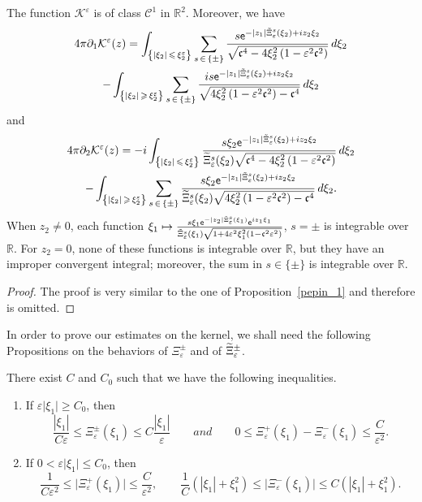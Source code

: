 \documentclass[AHL,Unicode,longabstracts,published]{cedram}
\newcommand*\p{\partial}
\newcommand*\R{\mathbb R}
\newcommand*\BC{\mathcal{C}}
\newcommand*\BK{\mathcal{K}}
\newcommand*\ex{{\sf e}}
\newcommand*\cs{{\mathfrak c}}
\newcommand*\gs{\geqslant }
\newcommand*\ls{\leqslant }
\newcommand*\e{\varepsilon}
\renewcommand*\t{\tilde}
\newcommand*{\romanenumi}{\renewcommand*{\theenumi}{\roman{enumi}}}
\let\oldtilde\tilde
\renewcommand*{\tilde}[1]{\mathchoice{\widetilde{#1}}{\widetilde{#1}}{\oldtilde{#1}}{\oldtilde{#1}}}
\begin{document}
\begin{prop}\label{pepin_2}
The function $ \BK^\e $ is of class $ \BC^1 $ in $ \R^2 $. Moreover, we have
\begin{multline*}
4 \pi \p_1 \BK^\e (z)=
 \int_{\left\{ |\xi_2 | \,\ls\,\xi_2^\e \right\} } \sum_{s\,\in\,\{ \pm \} }
\frac{ s \ex^{- |z_1| \t\Xi_\e^s (\xi_2) + i z_2 \xi_2} }{
\sqrt{ \cs^4 - 4 \xi_2^2 \left(1 - \e^2 \cs^2\right)}} \, d\xi_2\\
 - \int_{\left\{ |\xi_2 |\,\gs\,\xi_2^\e \right\} } \sum_{s\,\in\,\{ \pm \} } \frac{i s \ex^{- |z_1| \t\Xi_\e^s (\xi_2) + i z_2 \xi_2} }{\sqrt{ 4 \xi_2^2 \left(1 - \e^2 \cs^2\right) - \cs^4 } } \, d\xi_2
\end{multline*}
and
\begin{multline*}
4 \pi \p_2 \BK^\e (z)  =
-i \int_{\left\{ |\xi_2 |\,\ls\,\xi_2^\e \right\}}
\frac{ s \xi_2 \ex^{- |z_1| \t\Xi_\e^s (\xi_2) + i z_2 \xi_2}}{\t\Xi_\e^s (\xi_2) \sqrt{ \cs^4 - 4 \xi_2^2 \left(1 - \e^2 \cs^2\right)}} \, d\xi_2\\
- \int_{\left\{ |\xi_2 |\,\gs\,\xi_2^\e \right\} } \sum_{s\,\in\,\{ \pm \}}
\frac{s \xi_2 \ex^{- |z_1| \t\Xi_\e^s (\xi_2) + i z_2 \xi_2}}{\t\Xi_\e^s (\xi_2) \sqrt{ 4 \xi_2^2 \left(1 - \e^2 \cs^2\right) - \cs^4}} \, d\xi_2.
\end{multline*}
When $ z_2 \neq 0 $, each function $ \xi_1 \mapsto \frac{ s \xi_1 \ex^{- |z_2| \t{\Xi}_\e^s (\xi_1)} \ex^{i z_1 \xi_1} }{\t{\Xi}_\e^s (\xi_1)
\sqrt{1 + 4\e^2 \xi_1^2 (1 - \cs^2 \e^2) } } $, $ s = \pm $ is integrable over $ \R $. For $ z_2 = 0 $, none of these functions is integrable over $ \R $, but they have an improper convergent integral; moreover, the sum in $s \in \{ \pm \} $ is integrable over $\R $.
\end{prop}

\begin{proof} 
The proof is very similar to the one of Proposition~\ref{pepin_1} and therefore is omitted.
\end{proof}


In order to prove our estimates on the kernel, we shall need the following Propositions on the behaviors of $ \Xi_\e^{\pm} $ and of $ \tilde{\Xi}_\e^{\pm} $.

\begin{prop}\label{asym_Z}
There exist $ C $ and $ C_0 $ such that we have the following inequalities.
\begin{enumerate}\romanenumi
\item\label{prop3.3.1} If $ \e \lvert \xi_1 \rvert \gs C_0 $, then
\[
\frac{| \xi_1|} {C \e } \ls \Xi_\e^\pm (\xi_1) \ls C \frac{| \xi_1|} {\e }
\quad \quad and \quad \quad 0 \ls \Xi_\e^+ (\xi_1) - \Xi_\e^- (\xi_1)
\ls \frac{ C} {\e^2 }.
\]

\item\label{prop3.3.2} If $ 0 < \e \lvert \xi_1 \rvert \ls C_0 $, then
\[
\frac{1}{C\e^2} \ls \lvert \Xi_\e^+ (\xi_1) \rvert \ls \frac{C}{\e^2},
\qquad
\frac{1}{C} \left(| \xi_1 | + \xi_1^2\right) \ls \lvert \Xi_\e^- (\xi_1) \rvert \ls C \left(| \xi_1 | + \xi_1^2\right).
\]
\end{enumerate}
\end{prop}
\end{document}
